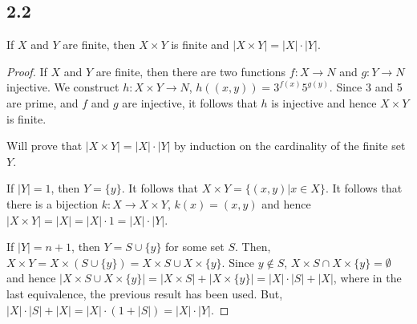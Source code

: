 \subsection*{2.2} If $X$ and $Y$ are finite, then $X \times Y$ is finite and $|X \times Y| = |X| \cdot |Y|$.

\begin{proof}
If $X$ and $Y$ are finite, then there are two functions $f:X \rightarrow N$ and $g:Y \rightarrow N$ injective. We construct $h:X \times Y \rightarrow N$, $h((x,y)) = 3^{f(x)}5^{g(y)}$. Since 3 and 5 are prime, and $f$ and $g$ are injective, it follows that $h$ is injective and hence $X \times Y$ is finite.

Will prove that $|X \times Y| = |X| \cdot |Y|$ by induction on the cardinality of the finite set $Y$.

If $|Y| = 1$, then $Y = \{y\}$. It follows that $X \times Y = \{(x,y)|x \in X\}$. It follows that there is a bijection $k:X \rightarrow X \times Y$, $k(x) = (x,y)$ and hence $|X \times Y| = |X| = |X| \cdot 1 = |X| \cdot |Y|$.

If $|Y| = n+1$, then $Y = S \cup \{y\}$ for some set $S$. Then, $X \times Y = X \times (S \cup \{y\}) = X \times S \cup X \times \{y\}$. Since $y \notin S$, $X \times S \cap X \times \{y\} = \emptyset$ and hence $|X \times S \cup X \times \{y\}| = |X \times S| + |X \times \{y\}| = |X| \cdot |S| + |X|$, where in the last equivalence, the previous result has been used. But, $|X| \cdot |S| + |X| = |X| \cdot (1 + |S|) = |X| \cdot |Y|$.
\end{proof}

